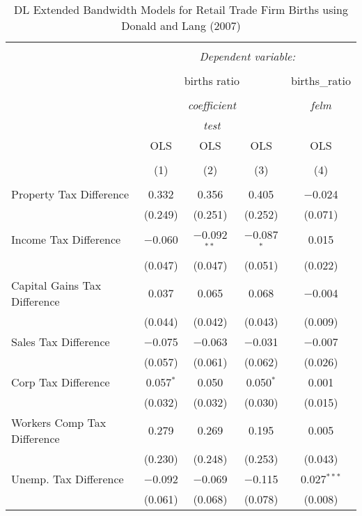 
\begin{table}[!htbp] \centering 
  \caption{DL Extended Bandwidth Models for  Retail Trade Firm Births using Donald and Lang (2007)} 
  \label{} 
\begin{tabular}{@{\extracolsep{5pt}}lcccc} 
\\[-1.8ex]\hline 
\hline \\[-1.8ex] 
 & \multicolumn{4}{c}{\textit{Dependent variable:}} \\ 
\cline{2-5} 
\\[-1.8ex] & \multicolumn{3}{c}{births ratio} & births\_ratio \\ 
\\[-1.8ex] & \multicolumn{3}{c}{\textit{coefficient}} & \textit{felm} \\ 
 & \multicolumn{3}{c}{\textit{test}} & \textit{} \\ 
 & OLS & OLS & OLS & OLS \\ 
\\[-1.8ex] & (1) & (2) & (3) & (4)\\ 
\hline \\[-1.8ex] 
 Property Tax Difference & 0.332 & 0.356 & 0.405 & $-$0.024 \\ 
  & (0.249) & (0.251) & (0.252) & (0.071) \\ 
  Income Tax Difference & $-$0.060 & $-$0.092$^{**}$ & $-$0.087$^{*}$ & 0.015 \\ 
  & (0.047) & (0.047) & (0.051) & (0.022) \\ 
  Capital Gains Tax Difference & 0.037 & 0.065 & 0.068 & $-$0.004 \\ 
  & (0.044) & (0.042) & (0.043) & (0.009) \\ 
  Sales Tax Difference & $-$0.075 & $-$0.063 & $-$0.031 & $-$0.007 \\ 
  & (0.057) & (0.061) & (0.062) & (0.026) \\ 
  Corp Tax Difference & 0.057$^{*}$ & 0.050 & 0.050$^{*}$ & 0.001 \\ 
  & (0.032) & (0.032) & (0.030) & (0.015) \\ 
  Workers Comp Tax Difference & 0.279 & 0.269 & 0.195 & 0.005 \\ 
  & (0.230) & (0.248) & (0.253) & (0.043) \\ 
  Unemp. Tax Difference & $-$0.092 & $-$0.069 & $-$0.115 & 0.027$^{***}$ \\ 
  & (0.061) & (0.068) & (0.078) & (0.008) \\ 

\end{tabular}
\end{table}
